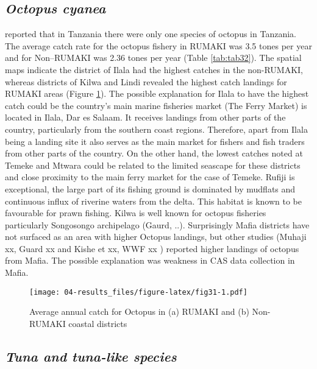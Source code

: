 \documentclass[
  12pt,
  a4paper,
  oneside]{book}
\begin{document}
\hypertarget{octopus-cyanea}{%
\subsection{\texorpdfstring{\emph{Octopus cyanea}}{Octopus cyanea}}\label{octopus-cyanea}}

\citet{guard} reported that in Tanzania there were only one species of octopus in Tanzania. The average catch rate for the octopus fishery in RUMAKI was 3.5 tones per year and for Non--RUMAKI was 2.36 tones per year (Table \ref{tab:tab32}). The spatial maps indicate the district of Ilala had the highest catches in the non-RUMAKI, whereas districts of Kilwa and Lindi revealed the highest catch landings for RUMAKI areas (Figure \ref{fig:fig31}). The possible explanation for Ilala to have the highest catch could be the country's main marine fisheries market (The Ferry Market) is located in Ilala, Dar es Salaam. It receives landings from other parts of the country, particularly from the southern coast regions. Therefore, apart from Ilala being a landing site it also serves as the main market for fishers and fish traders from other parts of the country. On the other hand, the lowest catches noted at Temeke and Mtwara could be related to the limited seascape for these districts and close proximity to the main ferry market for the case of Temeke. Rufiji is exceptional, the large part of its fishing ground is dominated by mudflats and continuous influx of riverine waters from the delta. This habitat is known to be favourable for prawn fishing. Kilwa is well known for octopus fisheries particularly Songosongo archipelago (Gaurd, ..). Surprisingly Mafia districts have not surfaced as an area with higher Octopus landings, but other studies (Muhaji xx, Guard xx and Kishe et xx, WWF xx ) reported higher landings of octopus from Mafia. The possible explanation was weakness in CAS data collection in Mafia.

\begin{figure}
\centering
\texttt{[image: 04-results\_files/figure-latex/fig31-1.pdf]}
\caption{\label{fig:fig31}Average annual catch for Octopus in (a) RUMAKI and (b) Non-RUMAKI coastal districts}
\end{figure}

\hypertarget{tuna-and-tuna-like-species}{%
\subsection{\texorpdfstring{\emph{Tuna and tuna-like species }}{Tuna and tuna-like species }}\label{tuna-and-tuna-like-species}}
\end{document}
